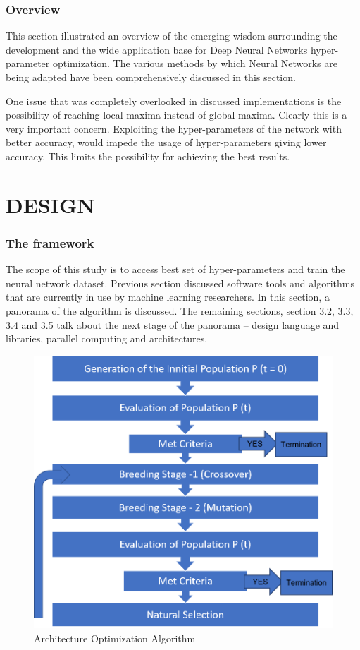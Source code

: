 \subsection{Overview}
This section illustrated an overview of the emerging wisdom surrounding the development and the wide application base for Deep Neural Networks hyper-parameter optimization. The various methods by which Neural Networks are being adapted have been comprehensively discussed in this section. 

One issue that was completely overlooked in discussed implementations is the possibility of reaching local maxima instead of global maxima. Clearly this is a very important concern. Exploiting the hyper-parameters of the network with better accuracy, would impede the usage of hyper-parameters giving lower accuracy. This limits the possibility for achieving the best results.


\chapter{DESIGN}



\subsection{The framework}

The scope of this study is to access best set of hyper-parameters and train the neural network dataset. Previous section discussed software tools and algorithms that are currently in use by machine learning researchers. In this section, a panorama of the algorithm is discussed. The remaining sections, section 3.2, 3.3, 3.4 and 3.5 talk about the next stage of the panorama – design language and libraries, parallel computing and architectures.

\begin{figure}
	\centering
	\includegraphics[width=1.0\columnwidth]{introduction/fig3a.png}
	\caption{Architecture Optimization Algorithm}
\end{figure}

